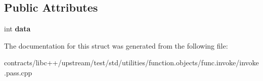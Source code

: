 \subsection*{Public Attributes}
\begin{DoxyCompactItemize}
\item 
\mbox{\label{struct_test_class_a373b1fa1f115356d7c7c26b9137c5e22}} 
int {\bfseries data}
\end{DoxyCompactItemize}


The documentation for this struct was generated from the following file\+:\begin{DoxyCompactItemize}
\item 
contracts/libc++/upstream/test/std/utilities/function.\+objects/func.\+invoke/invoke.\+pass.\+cpp\end{DoxyCompactItemize}
